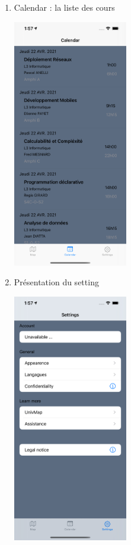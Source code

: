 \documentclass{article}
\begin{document}
\begin{enumerate}
\item Calendar : la liste des cours
    \begin{center}
        \includegraphics[width=50mm, scale=0.5]{calendar.png}
    \end{center}

\item Présentation du setting
    \begin{center}
        \includegraphics[width=50mm, scale=0.5]{setting.png}
    \end{center}

\end{enumerate}
\end{document}
